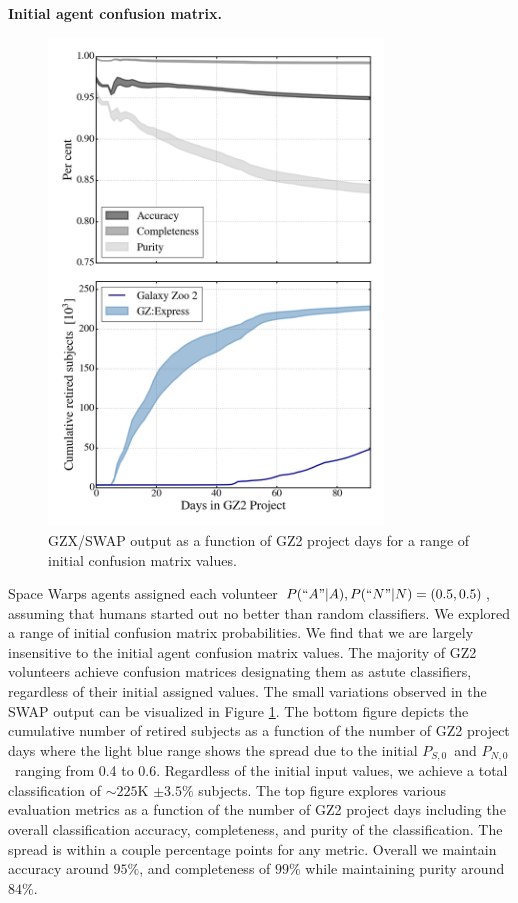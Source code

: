 \documentclass[twocolumn]{aastex6}
\newcommand{\Ps}{$P_{S,0}$}
\newcommand{\Pn}{$P_{N,0}$}
\begin{document}
\textbf{Initial agent confusion matrix.} 
\begin{figure}[t!]
\includegraphics[width=3.5in]{GZX_eval_and_retirement_spread_initialconfusionmatrix_4paper.png}
\caption{GZX/SWAP output as a function of GZ2 project days for a range of initial
confusion matrix values.  \label{fig:confusionmatrixanalysis}}
\end{figure}
Space Warps agents assigned each volunteer $P(``A"|A), P(``N"|N) = (0.5, 0.5)$, 
assuming that humans started out no better than random classifiers.  We explored a range
of initial confusion matrix probabilities. We find that we are largely insensitive to the 
initial agent confusion matrix values.  The majority of GZ2 volunteers achieve confusion
matrices designating them as astute classifiers, regardless of their initial assigned values. 
The  small variations observed in the SWAP output can be visualized in 
Figure \ref{fig:confusionmatrixanalysis}. The bottom figure depicts the cumulative 
number of retired subjects as a function of the number of GZ2 project days where the light blue range 
shows the spread due to the initial \Ps~and \Pn~ranging from 0.4 to 0.6. 
Regardless of the initial input values, we achieve a total classification of $\sim225$K  $\pm 3.5\%$ subjects. 
The top figure explores various evaluation metrics as a function of the number of 
GZ2 project days including the overall classification accuracy, completeness, and 
purity of the classification. The spread is within a couple percentage points for any
metric. Overall we maintain accuracy around $95\%$, and completeness of $99\%$
while maintaining purity around $84\%$. 
\end{document}
